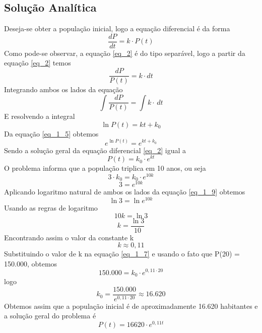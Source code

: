 \documentclass[12pt]{article}
\begin{document}
\subsection{Solução Analítica}
Deseja-se obter a população inicial, logo a equação diferencial é da forma
\begin{equation}
    \frac{dP}{dt} = k \cdot P(t)
\label{eq_2}
\end{equation}
Como pode-se observar, a equação \ref{eq_2} é do tipo separável, logo a partir da equação \ref{eq_2} temos
\begin{equation}
    \frac{dP}{P(t)} = k \cdot dt
\end{equation}
Integrando ambos os lados da equação
\begin{equation}
    \int \frac{dP}{P(t)} = \int k \cdot\, dt
\label{eq_4}
\end{equation}
E resolvendo a integral
\begin{equation}
    \ln{P(t)} = kt + k_0
\label{eq_1_5}
\end{equation}
Da equação \ref{eq_1_5} obtemos
\begin{equation}
    e^{\ln{P(t)}} = e^{kt + k_0}
\label{eq_1_6}
\end{equation}
Sendo a solução geral da equação diferencial \ref{eq_2} igual a
\begin{equation}
    P(t) = k_0 \cdot e^{kt}
\label{eq_1_7}
\end{equation}
O problema informa que a população triplica em 10 anos, ou seja
\begin{equation}
    3 \cdot k_0 = k_0 \cdot e^{10k}
\label{eq_1_8}
\end{equation}
\begin{equation}
    3 = e^{10k}
\label{eq_1_9}
\end{equation}
Aplicando logaritmo natural de ambos os lados da equação \ref{eq_1_9} obtemos
\begin{equation}
    \ln{3} = \ln{e^{10k}}
\label{eq_1_10}
\end{equation}
Usando as regras de logaritmo
\begin{equation}
    10k = \ln{3}
\label{eq_1_11}
\end{equation}
\begin{equation}
    k = \frac{\ln{3}}{10}
\label{eq_1_12}
\end{equation}
Encontrando assim o valor da constante k
\begin{equation}
    k \approx 0,11
\label{eq_1_13}
\end{equation}
Substituindo o valor de k na equação \ref{eq_1_7} e usando o fato que P(20) = 150.000, obtemos
\begin{equation}
    150.000 = k_0 \cdot e^{0,11 \cdot 20}
\label{eq_1_14}
\end{equation}
logo 
\begin{equation}
    k_0 = \frac{150.000}{e^{0,11 \cdot 20}} \approx 16.620
\label{eq_1_14}
\end{equation}
Obtemos assim que a população inicial é de aproximadamente 16.620 habitantes e a solução geral do problema é
\begin{equation}
    P(t) = 16620 \cdot e^{0,11t}
\label{eq_1_14}
\end{equation}
\end{document}
